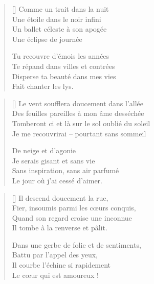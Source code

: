 
\settowidth{\versewidth}{Te répand dans villes et contrées}
\begin{verse}[\versewidth]
Comme un trait dans la nuit \\
Une étoile dans le noir infini \\
Un ballet céleste à son apogée \\
Une éclipse de journée

Tu recouvre d'émois les années \\
Te répand dans villes et contrées \\
Disperse ta beauté dans mes vies \\
Fait chanter les lys.
\end{verse}

\newpage

\settowidth{\versewidth}{Tomberont ci et là sur le sol oublié du soleil}
\begin{verse}[\versewidth]
Le vent soufflera doucement dans l'allée \\
Des feuilles pareilles à mon âme desséchée \\
Tomberont ci et là sur le sol oublié du soleil \\
Je me recouvrirai -- pourtant sans sommeil

De neige et d'agonie \\
Je serais gisant et sans vie \\
Sans inspiration, sans air parfumé \\
Le jour où j'ai cessé d'aimer.
\end{verse}


\settowidth{\versewidth}{Dans une gerbe de folie et de sentiments,}
\begin{verse}[\versewidth]
Il descend doucement la rue, \\
Fier, insoumis parmi les cœurs conquis, \\
Quand son regard croise une inconnue \\
Il tombe à la renverse et pâlit.

Dans une gerbe de folie et de sentiments, \\
Battu par l'appel des yeux, \\
Il courbe l'échine si rapidement \\
Le cœur qui est amoureux !
\end{verse}

